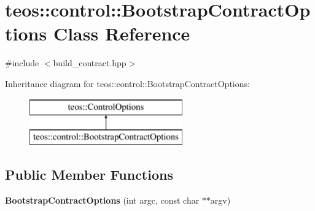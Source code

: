 \hypertarget{classteos_1_1control_1_1_bootstrap_contract_options}{}\section{teos\+:\+:control\+:\+:Bootstrap\+Contract\+Options Class Reference}
\label{classteos_1_1control_1_1_bootstrap_contract_options}


{\ttfamily \#include $<$build\+\_\+contract.\+hpp$>$}

Inheritance diagram for teos\+:\+:control\+:\+:Bootstrap\+Contract\+Options\+:\begin{figure}[H]
\begin{center}
\leavevmode
\includegraphics[height=2.000000cm]{classteos_1_1control_1_1_bootstrap_contract_options}
\end{center}
\end{figure}
\subsection*{Public Member Functions}
\begin{DoxyCompactItemize}
\item 
\mbox{\label{classteos_1_1control_1_1_bootstrap_contract_options_aec7082f056fb85762b2fe0133481cd5f}} 
{\bfseries Bootstrap\+Contract\+Options} (int argc, const char $\ast$$\ast$argv)
\end{DoxyCompactItemize}
